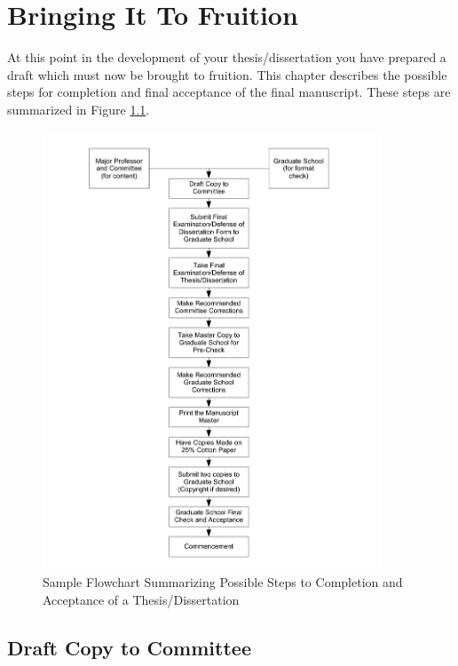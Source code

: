 \chapter{Bringing It To Fruition}
\label{chap:BringingItToFruition}

At this point in the development of your the\-sis/dis\-ser\-ta\-tion
you have prepared a draft which must now be brought to fruition. This
chapter describes the possible steps for completion and final
acceptance of the final manuscript. These steps are summarized in
Figure \ref{fig:ThesisFlowchart}.
\begin{figure}[tbp]
  \centering
  \includegraphics[width=0.9\textwidth]{thesis-manual-content/thesis-flowchart}
  \caption{Sample Flowchart Summarizing Possible Steps to Completion and Acceptance of a The\-sis/Dis\-ser\-ta\-tion}
  \label{fig:ThesisFlowchart}
\end{figure}

\section{Draft Copy to Committee}
\label{sec:DraftCopyToCommittee}

